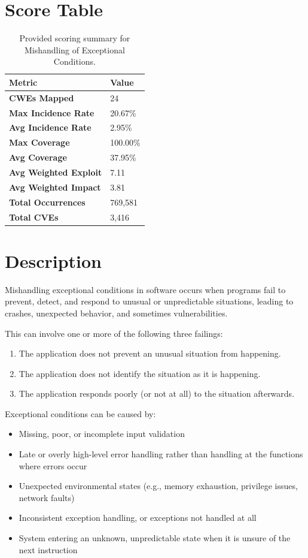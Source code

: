 \documentclass[11pt]{article}
\begin{document}
\section{Score Table}
\begin{table}[h!]
\centering
\renewcommand{\arraystretch}{1.2}
\begin{tabular}{@{}>{\bfseries}p{4.9cm}p{3.1cm}@{}}
\toprule
Metric & Value \\
\midrule
CWEs Mapped & 24 \\
Max Incidence Rate & 20.67\% \\
Avg Incidence Rate & 2.95\% \\
Max Coverage & 100.00\% \\
Avg Coverage & 37.95\% \\
Avg Weighted Exploit & 7.11 \\
Avg Weighted Impact & 3.81 \\
Total Occurrences & 769{,}581 \\
Total CVEs & 3{,}416 \\
\bottomrule
\end{tabular}
\caption{Provided scoring summary for Mishandling of Exceptional Conditions.}
\end{table}

\section{Description}
Mishandling exceptional conditions in software occurs when programs fail to prevent, detect, and respond to unusual or unpredictable situations, leading to crashes, unexpected behavior, and sometimes vulnerabilities.

This can involve one or more of the following three failings:
\begin{enumerate}
  \item The application does not prevent an unusual situation from happening.
  \item The application does not identify the situation as it is happening.
  \item The application responds poorly (or not at all) to the situation afterwards.
\end{enumerate}

Exceptional conditions can be caused by:
\begin{itemize}
  \item Missing, poor, or incomplete input validation
  \item Late or overly high-level error handling rather than handling at the functions where errors occur
  \item Unexpected environmental states (e.g., memory exhaustion, privilege issues, network faults)
  \item Inconsistent exception handling, or exceptions not handled at all
  \item System entering an unknown, unpredictable state when it is unsure of the next instruction
\end{itemize}
\end{document}
